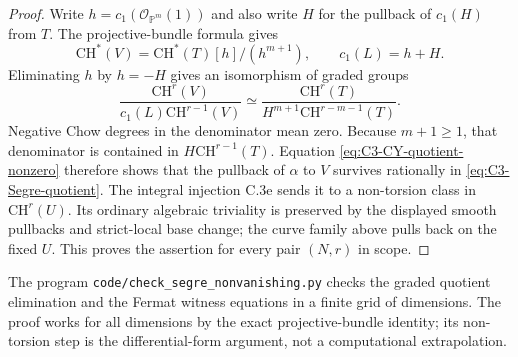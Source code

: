 \begin{proof}
Write $h=c_1(\mathcal O_{\mathbb P^m}(1))$ and also write
$H$ for the pullback of $c_1(H)$ from $T$. The projective-bundle
formula gives
\[
 \mathrm{CH}^*(V)
       =\mathrm{CH}^*(T)[h]/(h^{m+1}),\qquad c_1(L)=h+H.
\]
Eliminating $h$ by $h=-H$ gives an isomorphism of graded groups
\begin{equation}\label{eq:C3-Segre-quotient}
 \frac{\mathrm{CH}^r(V)}{c_1(L)\mathrm{CH}^{r-1}(V)}
 \simeq
 \frac{\mathrm{CH}^r(T)}
       {H^{m+1}\mathrm{CH}^{r-m-1}(T)}.
\end{equation}
Negative Chow degrees in the denominator mean zero.
Because $m+1\ge1$, that denominator is contained in
$H\mathrm{CH}^{r-1}(T)$. Equation
\eqref{eq:C3-CY-quotient-nonzero} therefore shows that the
pullback of $\alpha$ to $V$ survives rationally in
\eqref{eq:C3-Segre-quotient}. The integral injection C.3e
sends it to a non-torsion class in $\mathrm{CH}^r(U)$.
Its ordinary algebraic triviality is preserved by the
displayed smooth pullbacks and strict-local base change;
the curve family above pulls back on the fixed $U$.
This proves the assertion for every pair $(N,r)$ in scope.
\end{proof}

The program \texttt{code/check\_segre\_nonvanishing.py} checks
the graded quotient elimination and the Fermat witness equations
in a finite grid of dimensions. The proof works for all
dimensions by the exact projective-bundle identity; its
non-torsion step is the differential-form argument, not a
computational extrapolation.
